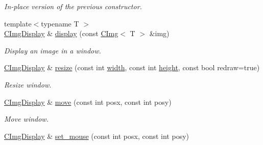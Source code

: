 \begin{DoxyCompactItemize}
\begin{DoxyCompactList}\small\item\em In-\/place version of the previous constructor. \end{DoxyCompactList}\item 
\hypertarget{structcimg__library_1_1_c_img_display_aaa6462c6f47ffb357053ba1601cd50d1}{{\footnotesize template$<$typename T $>$ }\\\hyperlink{structcimg__library_1_1_c_img_display}{C\-Img\-Display} \& \hyperlink{structcimg__library_1_1_c_img_display_aaa6462c6f47ffb357053ba1601cd50d1}{display} (const \hyperlink{structcimg__library_1_1_c_img}{C\-Img}$<$ T $>$ \&img)}\label{structcimg__library_1_1_c_img_display_aaa6462c6f47ffb357053ba1601cd50d1}

\begin{DoxyCompactList}\small\item\em Display an image in a window. \end{DoxyCompactList}\item 
\hypertarget{structcimg__library_1_1_c_img_display_aa344f0c6fcb96dad2b6a399a7b707d57}{\hyperlink{structcimg__library_1_1_c_img_display}{C\-Img\-Display} \& \hyperlink{structcimg__library_1_1_c_img_display_aa344f0c6fcb96dad2b6a399a7b707d57}{resize} (const int \hyperlink{structcimg__library_1_1_c_img_display_a98cd64f739f893359ec77105d65cfbb7}{width}, const int \hyperlink{structcimg__library_1_1_c_img_display_a0d9b09a5ee557d2a5e2380b642ebbf05}{height}, const bool redraw=true)}\label{structcimg__library_1_1_c_img_display_aa344f0c6fcb96dad2b6a399a7b707d57}

\begin{DoxyCompactList}\small\item\em Resize window. \end{DoxyCompactList}\item 
\hypertarget{structcimg__library_1_1_c_img_display_afeec07e38bf1bc2257fd15827ef36e4c}{\hyperlink{structcimg__library_1_1_c_img_display}{C\-Img\-Display} \& \hyperlink{structcimg__library_1_1_c_img_display_afeec07e38bf1bc2257fd15827ef36e4c}{move} (const int posx, const int posy)}\label{structcimg__library_1_1_c_img_display_afeec07e38bf1bc2257fd15827ef36e4c}

\begin{DoxyCompactList}\small\item\em Move window. \end{DoxyCompactList}\item 
\hypertarget{structcimg__library_1_1_c_img_display_a38a72a55b3d0fb87e11706c018d55569}{\hyperlink{structcimg__library_1_1_c_img_display}{C\-Img\-Display} \& \hyperlink{structcimg__library_1_1_c_img_display_a38a72a55b3d0fb87e11706c018d55569}{set\-\_\-mouse} (const int posx, const int posy)}\label{structcimg__library_1_1_c_img_display_a38a72a55b3d0fb87e11706c018d55569}


\end{DoxyCompactItemize}

